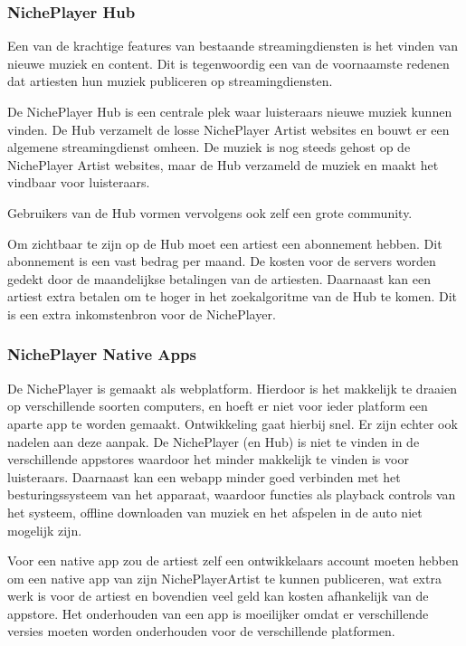 \subsubsection*{NichePlayer Hub}
Een van de krachtige features van bestaande streamingdiensten is het vinden van nieuwe muziek en content. Dit is tegenwoordig een van de voornaamste redenen dat artiesten hun muziek publiceren op streamingdiensten.

De NichePlayer Hub is een centrale plek waar luisteraars nieuwe muziek kunnen vinden. De Hub verzamelt de losse NichePlayer Artist websites en bouwt er een algemene streamingdienst omheen. De muziek is nog steeds gehost op de NichePlayer Artist websites, maar de Hub verzameld de muziek en maakt het vindbaar voor luisteraars.

Gebruikers van de Hub vormen vervolgens ook zelf een grote community. 

Om zichtbaar te zijn op de Hub moet een artiest een abonnement hebben. Dit abonnement is een vast bedrag per maand. De kosten voor de servers worden gedekt door de maandelijkse betalingen van de artiesten. Daarnaast kan een artiest extra betalen om te hoger in het zoekalgoritme van de Hub te komen. Dit is een extra inkomstenbron voor de NichePlayer.

\subsubsection*{NichePlayer Native Apps}
De NichePlayer is gemaakt als webplatform. Hierdoor is het makkelijk te draaien op verschillende soorten computers, en hoeft er niet voor ieder platform een aparte app te worden gemaakt. Ontwikkeling gaat hierbij snel. Er zijn echter ook nadelen aan deze aanpak. De NichePlayer (en Hub) is niet te vinden in de verschillende appstores waardoor het minder makkelijk te vinden is voor luisteraars. Daarnaast kan een webapp minder goed verbinden met het besturingssysteem van het apparaat, waardoor functies als playback controls van het systeem, offline downloaden van muziek en het afspelen in de auto niet mogelijk zijn.

Voor een native app zou de artiest zelf een ontwikkelaars account moeten hebben om een native app van zijn NichePlayerArtist te kunnen publiceren, wat extra werk is voor de artiest en bovendien veel geld kan kosten afhankelijk van de appstore. Het onderhouden van een app is moeilijker omdat er verschillende versies moeten worden onderhouden voor de verschillende platformen.

